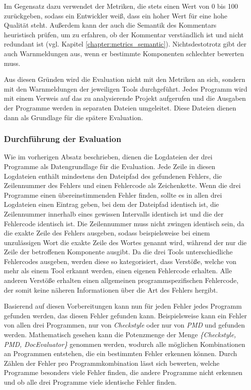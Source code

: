 Im Gegensatz dazu verwendet der \doceval Metriken, die stets einen Wert von 0 bis 100 zurückgeben, sodass ein Entwickler weiß, dass ein hoher Wert für eine hohe Qualität steht. Außerdem kann der \doceval auch die Semantik des Kommentars heuristisch prüfen, um zu erfahren, ob der Kommentar verständlich ist und nicht redundant ist (vgl. Kapitel \ref{chapter:metrics_semantic}). Nichtsdestotrotz gibt der \doceval auch Warnmeldungen aus, wenn er bestimmte Komponenten schlechter bewerten muss.

Aus diesen Gründen wird die Evaluation nicht mit den Metriken an sich, sondern mit den Warnmeldungen der jeweiligen Tools durchgeführt. Jedes Programm wird mit einem Verweis auf das zu analysierende Projekt aufgerufen und die Ausgaben der Programme werden in separaten Dateien umgeleitet.  Diese Dateien dienen dann als Grundlage für die spätere Evaluation. 

\subsubsection{Durchführung der Evaluation}
Wie im vorherigen Absatz beschrieben, dienen die Logdateien der drei Programme als Datengrundlage für die Evaluation. Jede Zeile in diesen Logdateien enthält mindestens den Dateipfad des gefundenen Fehlers, die Zeilennummer des Fehlers und einen Fehlercode als Zeichenkette.  Wenn die drei Programme einen übereinstimmenden Fehler finden, sollte es in allen drei Logdateien einen Eintrag geben, bei dem der Dateipfad identisch ist, die Zeilennummer innerhalb eines gewissen Intervalls identisch ist und die der Fehlercode identisch ist. Die Zeilennummer muss nicht zwingen identisch sein, da  \checkpmd die exakte Zeile des Fehlers ausgeben, sodass beispielsweise bei einem unzulässigen Wort die exakte Zeile des Wortes genannt wird, während der \doceval nur die Zeile der betroffenen Komponente ausgibt. Da die drei Tools unterschiedliche Fehlercodes ausgeben, werden diese so kategorisiert, dass Verstöße, welche von mehr als einem Tool erkannt werden, einen eigenen Fehlercode erhalten. Alle anderen Verstöße erhalten einen allgemeinen programmspezifischen Fehlercode, der somit keine näheren Informationen über die Art des Fehlers hergibt.

Basierend auf diesen Vorbereitungen kann nun für jeden Fehler jedes Programm gefunden werden, das diesen Fehler gefunden kann. Beispielsweise kann ein Fehler von allen drei Programmen, nur von \textit{Checkstyle} oder nur von \textit{PMD} und \doceval gefunden werden. Mathematisch gesehen kann die Potenzmenge der Menge \textit{\{Checkstyle, PMD, DocEvaluator\}} genommen werden, wodurch alle möglichen Kombinationen an Programmen entstehen, die ein bestimmten Fehler erkennen können. Durch Zählen der Fehler pro Programmkombination lässt sich bewerten, welche Programme besonders viele Fehler finden, die andere Programme nicht erkennen und ob alle drei Programme viele identische Fehler finden. 



